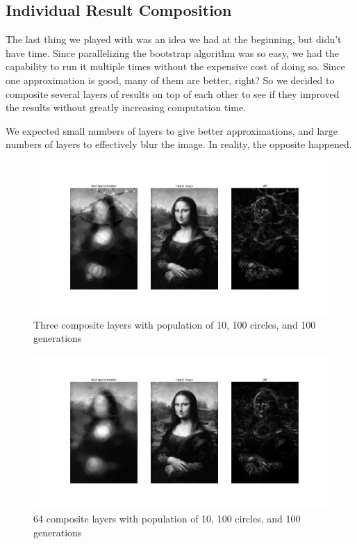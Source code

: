 \documentclass{article}
\begin{document}
\subsection{Individual Result Composition}

The last thing we played with was an idea we had at the beginning, but didn't have time. Since parallelizing the bootstrap algorithm was so easy, we had the capability to run it multiple times without the expensive cost of doing so. Since one approximation is good, many of them are better, right? So we decided to composite several layers of results on top of each other to see if they improved the results without greatly increasing computation time.

We expected small numbers of layers to give better approximations, and large numbers of layers to effectively blur the image. In reality, the opposite happened.

\begin{figure}[H]
    \centering
    \includegraphics[width=\textwidth]{output/average3_c100p10g100.png}
    \caption{Three composite layers with population of 10, 100 circles, and 100 generations}\label{fig:composite-3}
\end{figure}

\begin{figure}[H]
    \centering
    \includegraphics[width=\textwidth]{output/average_c100i10g100l64.png}
    \caption{64 composite layers with population of 10, 100 circles, and 100 generations}\label{fig:composite-64}
\end{figure}
\end{document}
